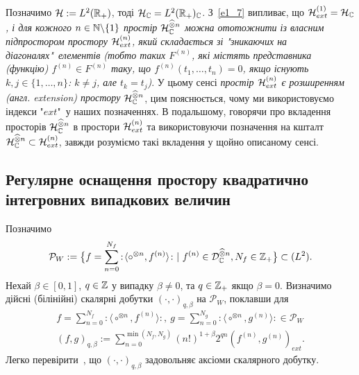 Позначимо $\mathcal{H}:=L^2(\mathbb{R}_+)$, тоді $\mathcal{H}_{\mathbb{C}}
=L^2(\mathbb{R}_+)_{\mathbb{C}}$. З~\eqref{e1_7} випливає, що
{\it $\mathcal{H}_{ext}^{(1)}=\mathcal{H}_{\mathbb{C}}$, і для кожного
$n\in\mathbb{N}\backslash\{1\}$ простір $\mathcal{H}_{\mathbb{C}}^{\widehat\otimes n}$
можна ототожнити із власним підпростором простору $\mathcal{H}_{ext}^{(n)}$, який
складається зі "зникаючих на діагоналях"\ елементів (тобто таких $F^{(n)}$, які містять
представника (функцію) $f^{(n)}\in F^{(n)}$ таку, що $f^{(n)}(t_1,\ldots,t_n)=0$, якщо
існують $k,j\in\{1,\ldots,n\}$: $k\not=j$, але $t_k=t_j$)}.
У цьому сенсі {\it простір $\mathcal{H}_{ext}^{(n)}$ є розширенням
(англ. extension) простору $\mathcal{H}_{\mathbb{C}}^{\widehat\otimes n}$}, цим
пояснюється, чому ми використовуємо індекси "$ext$"\ у наших позначеннях. В подальшому,
говорячи про вкладення просторів $\mathcal{H}_{\mathbb{C}}^{\widehat\otimes n}$ в простори
$\mathcal{H}_{ext}^{(n)}$ та використовуючи позначення на кшталт
$\mathcal{H}_{\mathbb{C}}^{\widehat\otimes n}\subset\mathcal{H}_{ext}^{(n)}$, завжди розуміємо
такі вкладення у щойно описаному сенсі.



\subsection{Регулярне оснащення простору квадратично інтегровних випадкових величин}
Позначимо
\begin{equation*}
\mathcal P_W:=\big\{f=\sum_{n=0}^{N_f}
{:\!\langle}\circ^{\otimes n},f^{(n)}{\rangle\!:}\ |\ f^{(n)}
\in\mathcal{D}_{\mathbb{C}}^{\widehat\otimes n},N_f\in\mathbb{Z}_+\big\}
\subset (L^2).
\end{equation*}
Нехай $\beta\in [0,1]$, $q\in\mathbb{Z}$ у випадку $\beta\not=0$,
та $q\in\mathbb{Z}_+$ якщо $\beta=0$.
Визначимо дійсні (білінійні) скалярні добутки
$(\cdot,\cdot)_{q,\beta}$ на $\mathcal P_W$, поклавши для
\begin{gather*}
f=\sum_{n=0}^{N_f}{:\!\langle}\circ^{\otimes n},f^{(n)}{\rangle\!:},
\ g=\sum_{n=0}^{N_g}{:\!\langle}\circ^{\otimes n},g^{(n)}{\rangle\!:}
\in\mathcal P_W\\
(f,g)_{q,\beta}:=\sum_{n=0}^{\min(N_f,N_g)}(n!)^{1+\beta}2^{qn}
(f^{(n)},g^{(n)})_{ext}.
\end{gather*}
Легко перевірити~\cite{F18}, що $(\cdot,\cdot)_{q,\beta}$ задовольняє аксіоми
скалярного добутку.

